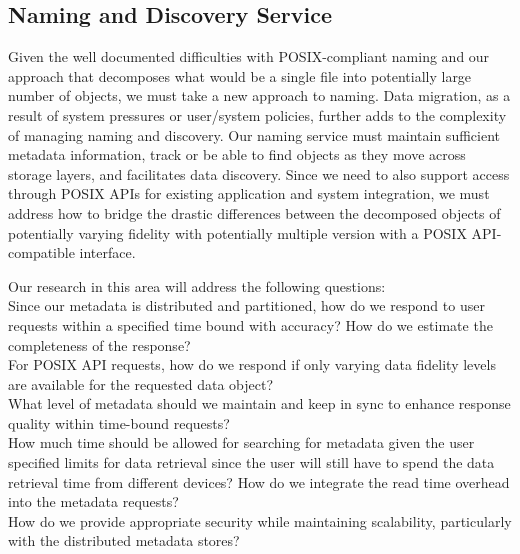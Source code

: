 \subsection{Naming and Discovery Service}

Given the well documented difficulties with POSIX-compliant naming and our
approach that decomposes what would be a single file into potentially large
number of objects, we must take a new approach to naming.  Data migration, as a
result of system pressures or user/system policies, further adds to the
complexity of managing naming and discovery. Our naming service must maintain
sufficient metadata information, track or be able to find objects as they move
across storage layers, and facilitates data discovery. Since we need to also
support access through POSIX APIs for existing application and system
integration, we must address how to bridge the drastic differences between the
decomposed objects of potentially varying fidelity with potentially multiple
version with a POSIX API-compatible interface.

Our research in this area will address the following questions:\\
Since our metadata is distributed and partitioned, how do we respond to user
  requests within a specified time bound with accuracy? How do we estimate the
  completeness of the response?\\
For POSIX API requests, how do we respond if only varying data fidelity levels
  are available for the requested data object?\\
What level of metadata should we maintain and keep in sync to enhance response
  quality within time-bound requests?\\
How much time should be allowed for searching for metadata given the user
  specified limits for data retrieval since the user will still have to spend
  the data retrieval time from different devices? How do we integrate the read
  time overhead into the metadata requests?\\
How do we provide appropriate security while maintaining scalability,
  particularly with the distributed metadata stores?\\

